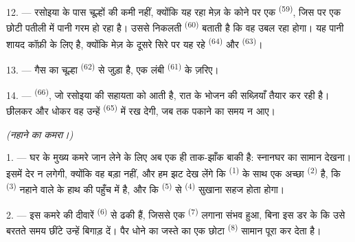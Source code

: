 12. --- रसोइया के पास चूल्हों की कमी नहीं, क्योंकि यह रहा मेज़ के कोने पर एक
 \textsuperscript{(59)}, जिस पर एक छोटी पतीली में पानी गरम
हो रहा है। उससे निकलती  \textsuperscript{(60)} बताती है कि वह उबल रहा
होगा। यह पानी शायद कॉफ़ी के लिए है, क्योंकि मेज़ के दूसरे सिरे पर यह रहे
 \textsuperscript{(64)} और 
\textsuperscript{(63)}।

13. --- गैस का चूल्हा  \textsuperscript{(62)} से जुड़ा
है, एक लंबी  \textsuperscript{(61)} के ज़रिए।

14. ---  \textsuperscript{(66)}, जो रसोइया की सहायता को
आती है, रात के भोजन की सब्ज़ियाँ तैयार कर रही है। छीलकर और धोकर वह उन्हें
 \textsuperscript{(65)} में रख देगी, जब तक पकाने का समय न आए।

\VUsaut{4.0mm}
{\centering\fontsize{10.2pt}{10.2pt}\selectfont{} \textit{(नहाने का कमरा।)}\par}
\VUsaut{3.0mm}

1. --- घर के मुख्य कमरे जान लेने के लिए अब एक ही ताक-झाँक बाकी है: स्नानघर का
सामान देखना। इसमें देर न लगेगी, क्योंकि वह बड़ा नहीं, और हम झट देख लेंगे कि
 \textsuperscript{(1)} के साथ एक अच्छा  \textsuperscript{(2)} है, कि  \textsuperscript{(3)}
नहाने वाले के हाथ की पहुँच में है, और कि 
\textsuperscript{(5)} से  \textsuperscript{(4)} सुखाना सहज होता
होगा।

2. --- इस कमरे की दीवारें  \textsuperscript{(6)} से ढकी
हैं, जिससे एक  \textsuperscript{(7)} लगाना संभव हुआ, बिना इस डर
के कि उसे बरतते समय छींटे उन्हें बिगाड़ दें। पैर धोने का जस्ते का एक छोटा
 \textsuperscript{(8)} सामान पूरा कर देता है।
\VUsaut{6.0mm}
\VUfilet{22mm}
